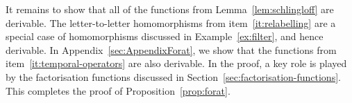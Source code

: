 It remains to show that all of the functions from Lemma~\ref{lem:schlingloff} are derivable. 
The letter-to-letter homomorphisms from item~\ref{it:relabelling} are   a special case of homomorphisms discussed in Example~\ref{ex:filter}, and hence derivable. In Appendix~\ref{sec:AppendixForat}, we show that the functions from item~\ref{it:temporal-operators} are also derivable. In the proof, a key role is played by the factorisation functions discussed in Section~\ref{sec:factorisation-functions}. This completes the proof of  Proposition~\ref{prop:forat}.
